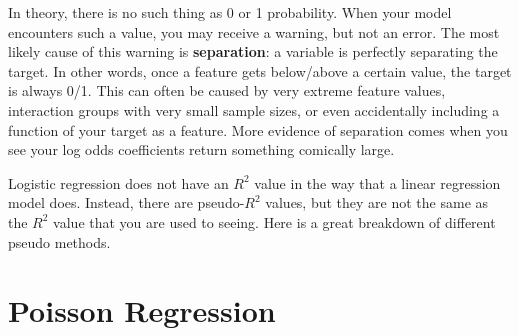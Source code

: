 \documentclass[
  letterpaper,
]{krantz}
\begin{document}
\begin{tcolorbox}[enhanced jigsaw, toprule=.15mm, arc=.35mm, rightrule=.15mm, bottomrule=.15mm, leftrule=.75mm, breakable, colframe=quarto-callout-important-color-frame, colback=white, left=2mm, opacityback=0]
\begin{minipage}[t]{5.5mm}
\textcolor{quarto-callout-important-color}{\faExclamation}
\end{minipage}%
\begin{minipage}[t]{\textwidth - 5.5mm}

In theory, there is no such thing as 0 or 1 probability. When your model
encounters such a value, you may receive a warning, but not an error.
The most likely cause of this warning is \textbf{separation}: a variable
is perfectly separating the target. In other words, once a feature gets
below/above a certain value, the target is always 0/1. This can often be
caused by very extreme feature values, interaction groups with very
small sample sizes, or even accidentally including a function of your
target as a feature. More evidence of separation comes when you see your
log odds coefficients return something comically large.

\end{minipage}%
\end{tcolorbox}

\begin{tcolorbox}[enhanced jigsaw, toprule=.15mm, arc=.35mm, rightrule=.15mm, bottomrule=.15mm, leftrule=.75mm, breakable, colframe=quarto-callout-warning-color-frame, colback=white, left=2mm, opacityback=0]
\begin{minipage}[t]{5.5mm}
\textcolor{quarto-callout-warning-color}{\faExclamationTriangle}
\end{minipage}%
\begin{minipage}[t]{\textwidth - 5.5mm}

Logistic regression does not have an \(R^2\) value in the way that a
linear regression model does. Instead, there are pseudo-\(R^2\) values,
but they are not the same as the \(R^2\) value that you are used to
seeing. Here is a great breakdown of different pseudo methods.

\end{minipage}%
\end{tcolorbox}

\section{Poisson Regression}\label{sec-glm-poisson}
\end{document}
